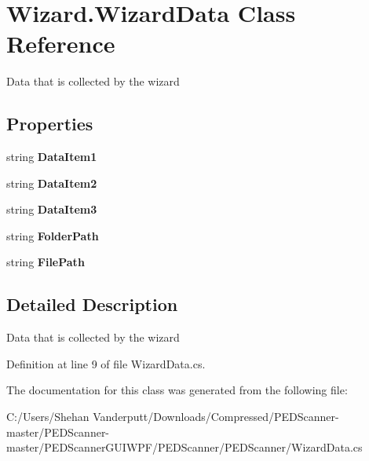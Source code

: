 \hypertarget{class_wizard_1_1_wizard_data}{}\section{Wizard.\+Wizard\+Data Class Reference}
\label{class_wizard_1_1_wizard_data}


Data that is collected by the wizard  


\subsection*{Properties}
\begin{DoxyCompactItemize}
\item 
\mbox{\label{class_wizard_1_1_wizard_data_a3e0ea7eb20774a38417dc869ec5d47ce}} 
string {\bfseries Data\+Item1}
\item 
\mbox{\label{class_wizard_1_1_wizard_data_ab17f76526a0d20dafeee21d665a9fff3}} 
string {\bfseries Data\+Item2}
\item 
\mbox{\label{class_wizard_1_1_wizard_data_ae011153e97a4632b878e0cac4bcb14e4}} 
string {\bfseries Data\+Item3}
\item 
\mbox{\label{class_wizard_1_1_wizard_data_afbc437376df3470d60c79ec957c36f58}} 
string {\bfseries Folder\+Path}
\item 
\mbox{\label{class_wizard_1_1_wizard_data_a469073e0e30443a5dba2170507fc867c}} 
string {\bfseries File\+Path}
\end{DoxyCompactItemize}


\subsection{Detailed Description}
Data that is collected by the wizard 



Definition at line 9 of file Wizard\+Data.\+cs.



The documentation for this class was generated from the following file\+:\begin{DoxyCompactItemize}
\item 
C\+:/\+Users/\+Shehan Vanderputt/\+Downloads/\+Compressed/\+P\+E\+D\+Scanner-\/master/\+P\+E\+D\+Scanner-\/master/\+P\+E\+D\+Scanner\+G\+U\+I\+W\+P\+F/\+P\+E\+D\+Scanner/\+P\+E\+D\+Scanner/Wizard\+Data.\+cs\end{DoxyCompactItemize}

